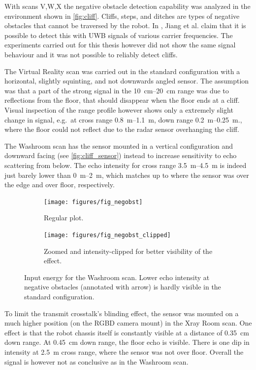 With scans V,W,X the negative obstacle detection capability was
analyzed in the environment shown in \cref{fig:cliff}. Cliffs, steps, and ditches are types of negative obstacles that cannot be traversed by the robot. In \cite{Jiang2015}, Jiang et al. claim that it is possible to detect this with UWB signals of various carrier frequencies. The experiments carried out for this thesis however did not show the same signal behaviour and it was not possible to reliably detect cliffs.

The Virtual Reality scan was carried out in the standard configuration
with a horizontal, slightly squinting, and not downwards angled sensor.
The assumption was that a part of the strong signal in the \SIrange{10}{20}{cm}
range was due to reflections from the floor, that should disappear when the
floor ends at a cliff. Visual inspection of the range profile however
shows only a extremely slight change in signal, e.g.~at cross range
\SIrange{0.8}{1.1}{m}, down range \SIrange{0.2}{0.25}{m}., where the floor could not reflect due to the radar sensor overhanging the cliff.

The Washroom scan has the sensor mounted in a vertical configuration and
downward facing (see \cref{fig:cliff_sensor}) instead to increase sensitivity to echo scattering from below. The echo intensity for cross range \SIrange{3.5}{4.5}{m} is indeed just
barely lower than \SIrange{0}{2}{m}, which matches up to where the sensor was over
the edge and over floor, respectively.

\begin{figure}[htbp]
    \centering
    \begin{subfigure}[t]{.475\textwidth}
        \texttt{[image: figures/fig\_negobst]}
        \caption{Regular plot.}
        \label{fig:negobst}
    \end{subfigure}%
    \hfill%
    \begin{subfigure}[t]{.475\textwidth}
        \texttt{[image: figures/fig\_negobst\_clipped]}
        \caption{Zoomed and intensity-clipped for better visibility of the effect.}
        \label{fig:negobst_clipped}
    \end{subfigure}
    \caption{Input energy for the Washroom scan. Lower echo intensity at negative obstacles (annotated with arrow) is hardly visible in the standard configuration.}
\end{figure}

To limit the transmit crosstalk's blinding effect, the sensor was
mounted on a much higher position (on the RGBD camera mount) in the Xray
Room scan. One effect is that the robot chassis itself is constantly
visible at a distance of \SI{0.35}{cm} down range. At \SI{0.45}{cm} down range, the
floor echo is visible. There is one dip in intensity at \SI{2.5}{m} cross
range, where the sensor was not over floor. Overall the signal is
however not as conclusive as in the Washroom scan.


